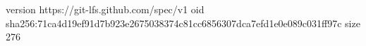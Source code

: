 version https://git-lfs.github.com/spec/v1
oid sha256:71ca4d19ef91d7b923e2675038374c81cc6856307dca7efd1e0e089c031ff97c
size 276
